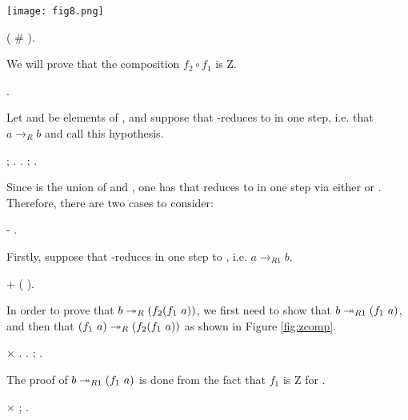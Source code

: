       \texttt{[image: fig8.png]} \begin{coqdoccode}
\coqdocemptyline
\coqdocindent{1.00em}
\coqdoctac{\ensuremath{\exists}} ( \# ). \end{coqdoccode}
We will prove that the composition $f_2 \circ f_1$
  is Z. \begin{coqdoccode}
\coqdocemptyline
\coqdocindent{1.00em}
   . \end{coqdoccode}
Let  and  be elements of , and suppose
  that  -reduces to  in one step, i.e. that $a \to_R b$ and
  call  this hypothesis. \begin{coqdoccode}
\coqdocemptyline
\coqdocindent{1.00em}
 ; .  .  ; . \end{coqdoccode}
Since
   is the union of  and , one has that  reduces to 
  in one step via either  or . Therefore, there are two cases
  to consider: \begin{coqdoccode}
\coqdocemptyline
\coqdocindent{1.00em}
- . \end{coqdoccode}
Firstly, suppose that  -reduces in one step to
    , i.e. $a \to_{R1} b$. \begin{coqdoccode}
\coqdocemptyline
\coqdocindent{2.00em}
+    ( ). \end{coqdoccode}
In order to prove
    that $b \tto_R (f_2 (f_1\ a))$, we first need to show that $b
    \twoheadrightarrow_{R1} (f_1\ a)$, and then that $(f_1\ a) \twoheadrightarrow_R (f_2 (f_1\ a))$ as
    shown in Figure \ref{fig:zcomp}. \begin{coqdoccode}
\coqdocemptyline
\coqdocindent{3.00em}
\ensuremath{\times}    .  .  ; . \end{coqdoccode}
    The proof of $b \twoheadrightarrow_{R1} (f_1\ a)$ is done from the fact that $f_1$
    is Z for . \begin{coqdoccode}
\coqdocemptyline
\coqdocindent{3.00em}
\ensuremath{\times}    ; . \end{coqdoccode}
